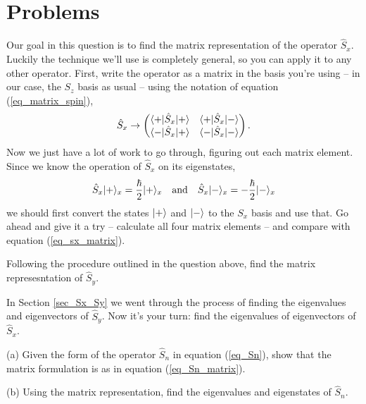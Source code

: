 \newpage

\section*{Problems}
%

\begin{problem}
\label{prob_Sx}

Our goal in this question is to find the matrix representation of the operator $\hat{S}_x$.  Luckily the technique we'll use is completely general, so you can apply it to any other operator.  First, write the operator as a matrix in the basis you're using -- in our case, the $S_z$ basis as usual -- using the notation of equation (\ref{eq_matrix_spin}),
\[
\hat{S}_x \to \begin{pmatrix}
\langle + |\hat{S}_x | + \rangle & \langle + |\hat{S}_x | - \rangle \\
\langle - |\hat{S}_x | + \rangle & \langle - |\hat{S}_x | - \rangle
\end{pmatrix}.
\]
Now we just have a lot of work to go through, figuring out each matrix element.  Since we know the operation of $\hat{S}_x$ on its eigenstates,
\[
\hat{S}_x | + \rangle_x = \frac{\hbar}{2} | + \rangle_x \quad \text{and} \quad \hat{S}_x | - \rangle_x = -\frac{\hbar}{2} | - \rangle_x
\]
we should first convert the states $| + \rangle$ and $| - \rangle$ to the $S_x$ basis and use that.  Go ahead and give it a try -- calculate all four matrix elements -- and compare with equation (\ref{eq_sx_matrix}).
\end{problem}

\begin{problem}
\label{prob_Sy}

Following the procedure outlined in the question above, find the matrix represesntation of $\hat{S}_y$.
\end{problem}

\begin{problem}
\label{prob_Sx_eigenvalues}

In Section \ref{sec_Sx_Sy} we went through the process of finding the eigenvalues and eigenvectors of $\hat{S}_y$.  Now it's your turn:  find the eigenvalues of eigenvectors of $\hat{S}_x$.  

\end{problem}

\begin{problem}
\label{prob_Sn}

(a) Given the form of the operator $\hat{S}_n$ in equation (\ref{eq_Sn}), show that the matrix formulation is as in equation (\ref{eq_Sn_matrix}).

(b) Using the matrix representation, find the eigenvalues and eigenstates of $\hat{S}_n$.
\end{problem}

